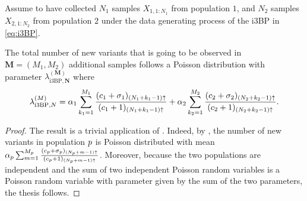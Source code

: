 \begin{myProposition}
    Assume to have collected $N_1$ samples $X_{1, 1:N_1}$ from population $1$, and $N_2$ samples $X_{2, 1:N_2}$ from population $2$ under the data generating process of the i3BP in \cref{eq:i3BP}. 

    The total number of new variants that is going to be observed in $\bm{M} = (M_1, M_2)$ additional samples follows a Poisson distribution with parameter $\lambda^{(\bm{M})}_{\mathrm{i3BP},\bm{N}}$ where 
    \begin{align*}
        \lambda^{(\bm{M})}_{\mathrm{i3BP},\bm{N}} = \alpha_1 \sum_{k_1=1}^{\futuresamplesize{1}} \frac{(c_1+\sigma_1)_{(\samplesize{1}+k_1-1)\uparrow}}{(c_1+1)_{(\samplesize{1}+k_1-1)\uparrow}}+ \alpha_2 \sum_{k_2=1}^{\futuresamplesize{2}} \frac{(c_2+\sigma_2)_{(\samplesize{2}+k_2-1)\uparrow}}{(c_2+1)_{(\samplesize{2}+k_2-1)\uparrow}}.
    \end{align*}
\end{myProposition}

\begin{proof}
    The result is a trivial application of \citet[Proposition 1]{Masoero2021}. Indeed, by \citet[Proposition 1]{Masoero2021},  the number of new variants in population $p$ is  Poisson distributed with mean $\alpha_p \sum_{m=1}^{M_{p}} \frac{(c_p+\sigma_p)_{(N_{p}+m-1)\uparrow}}{(c_p+1)_{(N_{p}+m-1)\uparrow}}$. Moreover, because the two populations are independent and the sum of two independent Poisson random variables is a Poisson random variable with parameter given by the sum of the two parameters, the thesis follows.
\end{proof}


